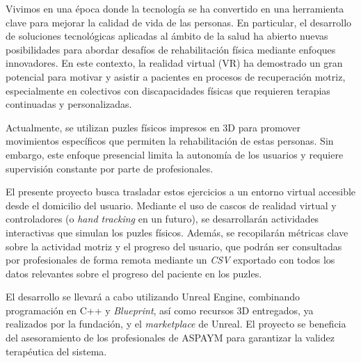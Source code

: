

Vivimos en una época donde la tecnología se ha convertido en una herramienta clave para mejorar la calidad de vida de las personas. En particular, el desarrollo de soluciones tecnológicas aplicadas al ámbito de la salud ha abierto nuevas posibilidades para abordar desafíos de rehabilitación física mediante enfoques innovadores. En este contexto, la realidad virtual (VR) ha demostrado un gran potencial para motivar y asistir a pacientes en procesos de recuperación motriz, especialmente en colectivos con discapacidades físicas que requieren terapias continuadas y personalizadas.

Actualmente, se utilizan puzles físicos impresos en 3D para promover movimientos específicos que permiten la rehabilitación de estas personas. Sin embargo, este enfoque presencial limita la autonomía de los usuarios y requiere supervisión constante por parte de profesionales.

El presente proyecto busca trasladar estos ejercicios a un entorno virtual accesible desde el domicilio del usuario. Mediante el uso de cascos de realidad virtual y controladores (o \textit{hand tracking} en un futuro), se desarrollarán actividades interactivas que simulan los puzles físicos. Además, se recopilarán métricas clave sobre la actividad motriz y el progreso del usuario, que podrán ser consultadas por profesionales de forma remota mediante un \textit{CSV} exportado con todos los datos relevantes sobre el progreso del paciente en los puzles.

El desarrollo se llevará a cabo utilizando Unreal Engine, combinando programación en C++ y \textit{Blueprint}, así como recursos 3D entregados, ya realizados por la fundación, y el \textit{marketplace} de Unreal. El proyecto se beneficia del asesoramiento de los profesionales de ASPAYM para garantizar la validez terapéutica del sistema.
